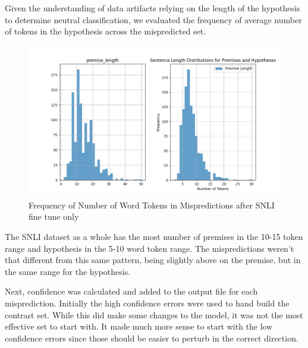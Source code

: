\documentclass[11pt]{article}
\begin{document}
Given the understanding of data artifacts relying on the length of the hypothesis to determine neutral classification, we evaluated the frequency of average number of tokens in the hypothesis across the mispredicted set. 
\begin{figure}[h!]
    \centering
    \includegraphics[width=0.5\linewidth]{FigurePremiseHypoWordCountFrequency.png}
    \caption{Frequency of Number of Word Tokens in Mispredictions after SNLI fine tune only}
    \label{fig:EarlyTokenCount}
\end{figure}
The SNLI dataset as a whole has the most number of premises in the 10-15 token range and hypothesis in the 5-10 word token range. The mispredictions weren't that different from this same pattern, being slightly above on the premise, but in the same range for the hypothesis.

Next, confidence was calculated and added to the output file for each misprediction. Initially the high confidence errors were used to hand build the contrast set. While this did make some changes to the model, it was not the most effective set to start with.  It made much more sense to start with the low confidence errors since those should be easier to perturb in the correct direction.
\end{document}
